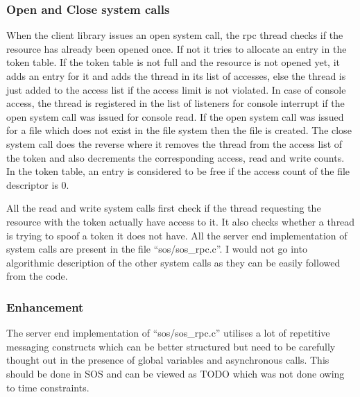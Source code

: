 \documentclass[a4paper, 11pt]{article}
\begin{document}
\subsubsection{Open and Close system calls}
When the client library issues an open system call, the rpc thread
checks if the resource has already been opened once. If not it tries
to allocate an entry in the token table. If the token table is not
full and the resource is not opened yet, it adds an entry for it and
adds the thread in its list of accesses, else the thread is just added
to the access list if the access limit is not violated. In case of
console access, the thread is registered in the list of listeners for
console interrupt if the open system call was issued for console
read. If the open system call was issued for a file which does not
exist in the file system then the file is created. The close system
call does the reverse where it removes the thread from the access list
of the token and also decrements the corresponding access, read and
write counts. In the token table, an entry is considered to be free if
the access count of the file descriptor is 0. 

 All the read and write
system calls first check if the thread requesting the resource with
the token actually have access to it. It also checks whether a thread
is trying to spoof a token it does not have. All the server end
implementation of system calls are present in the file
``sos/sos\_rpc.c''. I would not go into algorithmic description of the
other system calls as they can be easily followed from the code.

\subsubsection{Enhancement}
The server end implementation of ``sos/sos\_rpc.c'' utilises a lot of
repetitive messaging constructs which can be better structured but
need to be carefully thought out in the presence of global variables
and asynchronous calls. This should be done in SOS and can be viewed
as TODO which was not done owing to time constraints.

\newpage
\end{document}
